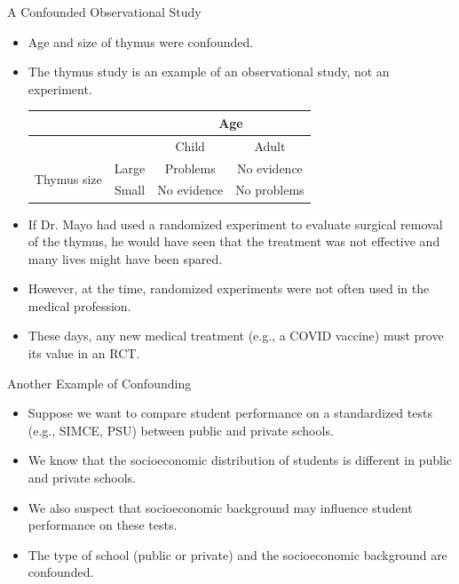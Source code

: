 \documentclass[handout]{beamer}
\begin{document}
\begin{frame}{A Confounded Observational Study}
\scriptsize{

\begin{itemize}


\item Age and size of thymus were confounded.

\item The thymus study is an example of an observational study, not an experiment.

\begin{table}
\center
 \begin{tabular}{|c|ccc|}  \hline
 
& & \multicolumn{2}{c|}{Age} \\ \hline
& & Child & Adult \\
\multirow{2}{*}{ Thymus size } & Large & Problems & No evidence \\ 
& Small & No evidence & No problems \\ \hline
\end{tabular} 
\end{table}

\item If Dr. Mayo had used a randomized experiment to evaluate surgical removal of the thymus, he would have seen that the treatment was not effective and many lives might have been
spared. 
\item However, at the time, randomized experiments were not often used in the medical profession.
  
\item These days, any new medical treatment (e.g., a COVID vaccine) must prove its value in an RCT.  
\end{itemize}



} 
\end{frame}

\begin{frame}{Another Example of Confounding}
\scriptsize{

\begin{itemize}

\item Suppose we want to compare student performance on a standardized tests (e.g., SIMCE, PSU) between public and private schools.

\item We know that the socioeconomic distribution of students is different in public and private schools.

\item We also suspect that socioeconomic background may influence student performance on these tests.

\item The type of school (public or private) and the socioeconomic background are confounded.
  
\end{itemize}



} 
\end{frame}
\end{document}

